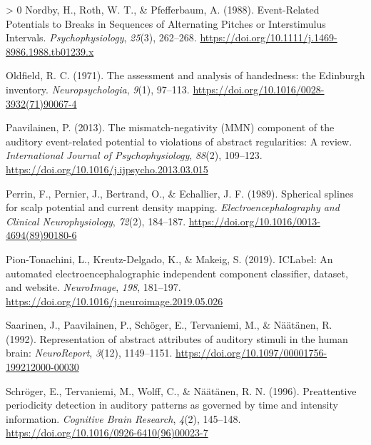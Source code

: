 \documentclass[stu,a4paper,12pt, nofontenc, babel, american]{apa7}
\newlength{\cslhangindent}
\newenvironment{CSLReferences}[3] %
 {%
  \setlength{\parindent}{0pt}
  \ifodd #1 \everypar{\setlength{\hangindent}{\cslhangindent}}\ignorespaces\fi
  \ifnum #2 > 0
  \setlength{\parskip}{#3\baselineskip}
  \fi
 }%
 {}
\begin{document}
\begin{CSLReferences}{1}{0}
\leavevmode\hypertarget{ref-nordbyEventRelatedPotentialsBreaks1988}{}%
Nordby, H., Roth, W. T., \& Pfefferbaum, A. (1988). Event-Related
Potentials to Breaks in Sequences of Alternating Pitches or
Interstimulus Intervals. \emph{Psychophysiology}, \emph{25}(3),
262--268. \url{https://doi.org/10.1111/j.1469-8986.1988.tb01239.x}

\leavevmode\hypertarget{ref-oldfieldAssessmentAnalysisHandedness1971}{}%
Oldfield, R. C. (1971). The assessment and analysis of handedness: the
Edinburgh inventory. \emph{Neuropsychologia}, \emph{9}(1), 97--113.
\url{https://doi.org/10.1016/0028-3932(71)90067-4}

\leavevmode\hypertarget{ref-paavilainenMismatchnegativityMMNComponent2013a}{}%
Paavilainen, P. (2013). The mismatch-negativity (MMN) component of the
auditory event-related potential to violations of abstract regularities:
A review. \emph{International Journal of Psychophysiology},
\emph{88}(2), 109--123.
\url{https://doi.org/10.1016/j.ijpsycho.2013.03.015}

\leavevmode\hypertarget{ref-perrinSphericalSplinesScalp1989}{}%
Perrin, F., Pernier, J., Bertrand, O., \& Echallier, J. F. (1989).
Spherical splines for scalp potential and current density mapping.
\emph{Electroencephalography and Clinical Neurophysiology},
\emph{72}(2), 184--187.
\url{https://doi.org/10.1016/0013-4694(89)90180-6}

\leavevmode\hypertarget{ref-pion-tonachiniICLabelAutomatedElectroencephalographic2019}{}%
Pion-Tonachini, L., Kreutz-Delgado, K., \& Makeig, S. (2019). ICLabel:
An automated electroencephalographic independent component classifier,
dataset, and website. \emph{NeuroImage}, \emph{198}, 181--197.
\url{https://doi.org/10.1016/j.neuroimage.2019.05.026}

\leavevmode\hypertarget{ref-saarinenRepresentationAbstractAttributes1992}{}%
Saarinen, J., Paavilainen, P., Schöger, E., Tervaniemi, M., \& Näätänen,
R. (1992). Representation of abstract attributes of auditory stimuli in
the human brain: \emph{NeuroReport}, \emph{3}(12), 1149--1151.
\url{https://doi.org/10.1097/00001756-199212000-00030}

\leavevmode\hypertarget{ref-schrogerPreattentivePeriodicityDetection1996}{}%
Schröger, E., Tervaniemi, M., Wolff, C., \& Näätänen, R. N. (1996).
Preattentive periodicity detection in auditory patterns as governed by
time and intensity information. \emph{Cognitive Brain Research},
\emph{4}(2), 145--148.
\url{https://doi.org/10.1016/0926-6410(96)00023-7}


\end{CSLReferences}
\end{document}
